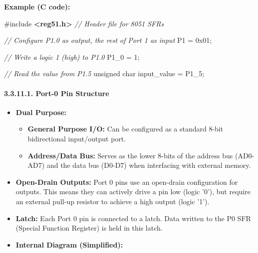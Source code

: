 \documentclass[
]{article}
\newenvironment{Shaded}{}{}
\newcommand{\BaseNTok}[1]{\textcolor[rgb]{0.25,0.63,0.44}{#1}}
\newcommand{\CommentTok}[1]{\textcolor[rgb]{0.38,0.63,0.69}{\textit{#1}}}
\newcommand{\DataTypeTok}[1]{\textcolor[rgb]{0.56,0.13,0.00}{#1}}
\newcommand{\DecValTok}[1]{\textcolor[rgb]{0.25,0.63,0.44}{#1}}
\newcommand{\ImportTok}[1]{\textcolor[rgb]{0.00,0.50,0.00}{\textbf{#1}}}
\newcommand{\NormalTok}[1]{#1}
\newcommand{\OperatorTok}[1]{\textcolor[rgb]{0.40,0.40,0.40}{#1}}
\newcommand{\PreprocessorTok}[1]{\textcolor[rgb]{0.74,0.48,0.00}{#1}}
\begin{document}
\textbf{Example (C code):}

\begin{Shaded}
\begin{Highlighting}[]
\PreprocessorTok{\#include }\ImportTok{\textless{}reg51.h\textgreater{}}\PreprocessorTok{ }\CommentTok{// Header file for 8051 SFRs}

\CommentTok{// Configure P1.0 as output, the rest of Port 1 as input}
\NormalTok{P1 }\OperatorTok{=} \BaseNTok{0x01}\OperatorTok{;}

\CommentTok{// Write a logic 1 (high) to P1.0}
\NormalTok{P1\_0 }\OperatorTok{=} \DecValTok{1}\OperatorTok{;}

\CommentTok{// Read the value from P1.5}
\DataTypeTok{unsigned} \DataTypeTok{char}\NormalTok{ input\_value }\OperatorTok{=}\NormalTok{ P1\_5}\OperatorTok{;}
\end{Highlighting}
\end{Shaded}

\hypertarget{33111-port-0-pin-structure}{%
\paragraph{3.3.11.1. Port-0 Pin
Structure}\label{33111-port-0-pin-structure}}

\begin{itemize}
\item
  \textbf{Dual Purpose:}

  \begin{itemize}
  \item
    \textbf{General Purpose I/O:} Can be configured as a standard 8-bit
    bidirectional input/output port.
  \item
    \textbf{Address/Data Bus:} Serves as the lower 8-bits of the address
    bus (AD0-AD7) and the data bus (D0-D7) when interfacing with
    external memory.
  \end{itemize}
\item
  \textbf{Open-Drain Outputs:} Port 0 pins use an open-drain
  configuration for outputs. This means they can actively drive a pin
  low (logic '0'), but require an external pull-up resistor to achieve a
  high output (logic '1').
\item
  \textbf{Latch:} Each Port 0 pin is connected to a latch. Data written
  to the P0 SFR (Special Function Register) is held in this latch.
\item
  \textbf{Internal Diagram (Simplified):}
\end{itemize}
\end{document}

